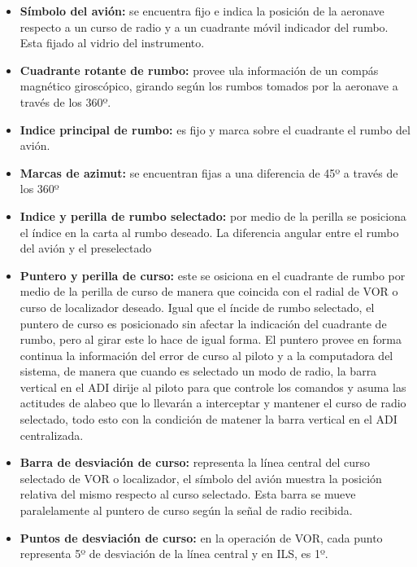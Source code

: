 \begin{itemize}
	\item {\bf S\'imbolo del avi\'on:} se encuentra fijo e indica la
		posici\'on de la aeronave respecto a un curso de radio
		y a un cuadrante m\'ovil indicador del rumbo. Esta fijado
		al vidrio del instrumento.

        \item {\bf Cuadrante rotante de rumbo:} provee ula informaci\'on de un
	comp\'as magn\'etico girosc\'opico, girando seg\'un los rumbos tomados por
	la aeronave a trav\'es de los 360º.

        \item {\bf Indice principal de rumbo: } 
	es fijo y marca sobre el cuadrante el rumbo del avi\'on.

        \item {\bf Marcas de azimut: }
	se encuentran fijas a una diferencia de 45º a trav\'es de los 360º

        \item {\bf Indice y perilla de rumbo selectado: }
	por medio de la perilla se posiciona el \'indice en la carta al rumbo
	deseado. La diferencia angular entre el rumbo del avi\'on y el preselectado
	

        \item {\bf Puntero y perilla de curso: } este se osiciona en el cuadrante de 
	rumbo por medio de la perilla de curso de manera que
	coincida con el radial de VOR o curso de localizador deseado.
	Igual que el \'incide de rumbo selectado, el puntero de curso es posicionado
	sin afectar la indicaci\'on del cuadrante de rumbo, pero al girar este
	lo hace de igual forma.
	El puntero provee en forma continua la informaci\'on del error de curso
	al piloto y a la computadora del sistema, de manera que 
	cuando es selectado un modo de radio, la barra vertical en el ADI
	dirije al piloto para que controle los comandos y asuma las actitudes
	de alabeo que lo llevar\'an a interceptar y mantener el curso de radio
	selectado, todo esto con la condici\'on de matener la barra vertical en el 
	ADI centralizada.

      \item {\bf Barra de desviaci\'on de curso: }
	representa la l\'inea central del curso selectado de VOR o localizador, 
	el s\'imbolo del avi\'on muestra la posici\'on relativa del mismo
	respecto al curso selectado. Esta barra se mueve paralelamente al puntero
	de curso seg\'un la se\~nal de radio recibida.

      \item {\bf Puntos de desviaci\'on de curso: }
	en la operaci\'on de VOR, cada punto representa 5º de desviaci\'on de la l\'inea
	central y en ILS, es 1º.


\end{itemize}
